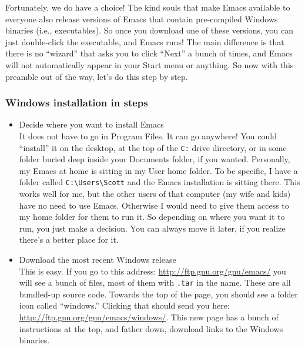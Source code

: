 \documentclass{article}
\begin{document}
Fortunately, we do have a choice!  The kind souls that make Emacs available to everyone also release versions of Emacs that contain pre-compiled Windows binaries (i.e., executables).  So once you download one of these versions, you can just double-click the executable, and Emacs runs! The main difference is that there is no ``wizard'' that asks you to click ``Next'' a bunch of times, and Emacs will not automatically appear in your Start menu or anything.  So now with this preamble out of the way, let's do this step by step.
\subsubsection{Windows installation in steps}
\label{sec-3-2-2}
\begin{itemize}

\item Decide where you want to install Emacs\\
\label{sec-3-2-2-1}%
It does not have to go in Program Files.  It can go anywhere! You could ``install'' it on the desktop, at the top of the \texttt{C:} drive directory, or in some folder buried deep inside your Documents folder, if you wanted. Personally, my Emacs at home is sitting in my User home folder.  To be specific, I have a folder called \texttt{C:\textbackslash{}Users\textbackslash{}Scott} and the Emacs installation is sitting there.  This works well for me, but the other users of that computer (my wife and kids) have no need to use Emacs.  Otherwise I would need to give them access to my home folder for them to run it.  So depending on where you want it to run, you just make a decision.  You can always move it later, if you realize there's a better place for it.

\item Download the most recent Windows release\\
\label{sec-3-2-2-2}%
This is easy. If you go to this address: \href{http://ftp.gnu.org/gnu/emacs/}{http://ftp.gnu.org/gnu/emacs/} you will see a bunch of files, most of them with \texttt{.tar} in the name. These are all bundled-up source code.  Towards the top of the page, you should see a folder icon called ``windows.'' Clicking that should send you here: \href{http://ftp.gnu.org/gnu/emacs/windows/}{http://ftp.gnu.org/gnu/emacs/windows/}. This new page has a bunch of instructions at the top, and father down, download links to the Windows binaries.


\end{itemize}
\end{document}
